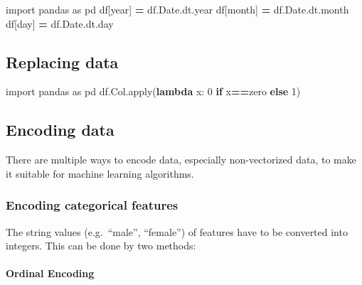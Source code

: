 \documentclass[
]{book}
\newenvironment{Shaded}{\begin{snugshade}}{\end{snugshade}}
\newcommand{\BuiltInTok}[1]{#1}
\newcommand{\ControlFlowTok}[1]{\textcolor[rgb]{0.13,0.29,0.53}{\textbf{#1}}}
\newcommand{\DecValTok}[1]{\textcolor[rgb]{0.00,0.00,0.81}{#1}}
\newcommand{\ImportTok}[1]{#1}
\newcommand{\KeywordTok}[1]{\textcolor[rgb]{0.13,0.29,0.53}{\textbf{#1}}}
\newcommand{\NormalTok}[1]{#1}
\newcommand{\OperatorTok}[1]{\textcolor[rgb]{0.81,0.36,0.00}{\textbf{#1}}}
\newcommand{\StringTok}[1]{\textcolor[rgb]{0.31,0.60,0.02}{#1}}
\begin{document}
\begin{Shaded}
\begin{Highlighting}[]
\ImportTok{import}\NormalTok{ pandas }\ImportTok{as}\NormalTok{ pd}
\NormalTok{df[}\StringTok{\textquotesingle{}year\textquotesingle{}}\NormalTok{] }\OperatorTok{=}\NormalTok{ df.Date.dt.year}
\NormalTok{df[}\StringTok{\textquotesingle{}month\textquotesingle{}}\NormalTok{] }\OperatorTok{=}\NormalTok{ df.Date.dt.month}
\NormalTok{df[}\StringTok{\textquotesingle{}day\textquotesingle{}}\NormalTok{] }\OperatorTok{=}\NormalTok{ df.Date.dt.day}
\end{Highlighting}
\end{Shaded}

\hypertarget{replacing-data}{%
\subsection{Replacing data}\label{replacing-data}}

\begin{Shaded}
\begin{Highlighting}[]
\ImportTok{import}\NormalTok{ pandas }\ImportTok{as}\NormalTok{ pd}
\NormalTok{df.Col.}\BuiltInTok{apply}\NormalTok{(}\KeywordTok{lambda}\NormalTok{ x: }\DecValTok{0} \ControlFlowTok{if}\NormalTok{ x}\OperatorTok{==}\StringTok{\textquotesingle{}zero\textquotesingle{}} \ControlFlowTok{else} \DecValTok{1}\NormalTok{)}
\end{Highlighting}
\end{Shaded}

\hypertarget{encoding-data}{%
\subsection{Encoding data}\label{encoding-data}}

There are multiple ways to encode data, especially non-vectorized data,
to make it suitable for machine learning algorithms.

\hypertarget{encoding-categorical-features}{%
\subsubsection{Encoding categorical features}\label{encoding-categorical-features}}

The string values (e.g.~``male'', ``female'') of features have to be
converted into integers. This can be done by two methods:

\hypertarget{ordinal-encoding}{%
\paragraph{Ordinal Encoding}\label{ordinal-encoding}}
\end{document}
